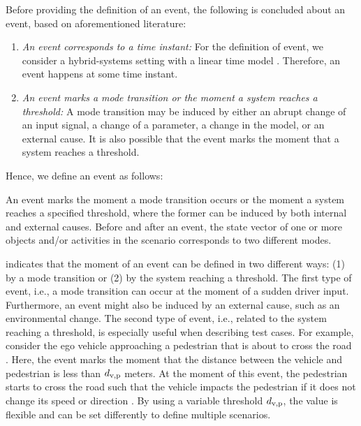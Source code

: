 Before providing the definition of an event, the following is concluded about an event, based on aforementioned literature:

\begin{enumerate}
	\item\textit{An event corresponds to a time instant:}
	\cstart For the definition of event, we consider a hybrid-systems setting with a linear time model \autocite{alur1994theory}. Therefore, an event happens at some time instant.\cend
	
	\item\textit{An event marks a mode transition or the moment a system reaches a threshold:} A mode transition may be \cstart induced \cend by either an abrupt change of an input signal, a change of a parameter, a change in the model, \cstart or an external cause. \cend It is also possible that the event marks the moment that a system reaches a threshold.
	
\end{enumerate}

Hence, we define an event as follows:
\begin{definition}[Event] \label{def:event}
	An event marks \cstart the moment a mode transition occurs or the moment a system reaches a specified threshold, where the former can be induced by both internal and external causes. \cend Before and after an event, the state vector \cstartb of one or more objects and/or activities in the scenario \cendb corresponds to two different modes.
\end{definition}

 indicates that the moment of an event can be defined in two different ways: \cstart(1) by a mode transition or (2) by the system reaching a threshold. 
The first type of event, i.e., a mode transition can occur at the moment of a sudden driver input. Furthermore, an event might also be induced by an external cause, such as an environmental change. The second type of event, i.e., related to the system reaching a threshold, \cend is especially useful when describing test cases. For example, consider the ego vehicle approaching a pedestrian that is about to cross the road \autocite{seiniger2015test}. 
Here, the event marks the moment that the distance between the vehicle and pedestrian is less than $d_{\mathrm{v,p}}$ meters. 
At the moment of this event, the pedestrian starts to cross the road such that the vehicle impacts the pedestrian if it does not change its speed or direction \autocite{seiniger2015test}.
By using a variable threshold $d_{\mathrm{v,p}}$, the value is flexible and can be set differently to define multiple scenarios.

